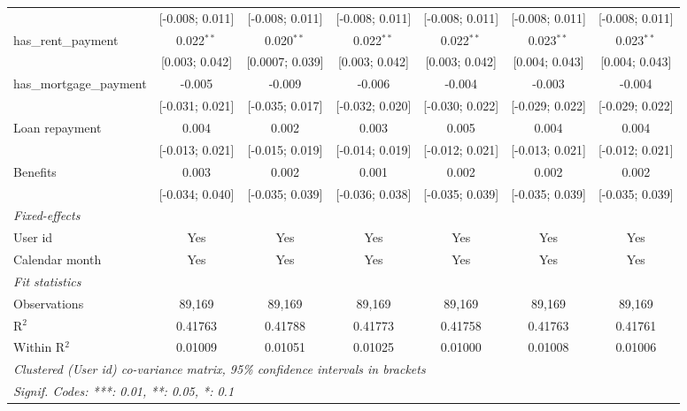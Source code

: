 \begin{table}[htbp]
\begin{threeparttable}[b]
\begin{tabular}{lcccccc}
                                   & [-0.008; 0.011]   & [-0.008; 0.011]  & [-0.008; 0.011]  & [-0.008; 0.011]  & [-0.008; 0.011]  & [-0.008; 0.011]\\   
         has\_rent\_payment        & 0.022$^{**}$      & 0.020$^{**}$     & 0.022$^{**}$     & 0.022$^{**}$     & 0.023$^{**}$     & 0.023$^{**}$\\   
                                   & [0.003; 0.042]    & [0.0007; 0.039]  & [0.003; 0.042]   & [0.003; 0.042]   & [0.004; 0.043]   & [0.004; 0.043]\\   
         has\_mortgage\_payment    & -0.005            & -0.009           & -0.006           & -0.004           & -0.003           & -0.004\\   
                                   & [-0.031; 0.021]   & [-0.035; 0.017]  & [-0.032; 0.020]  & [-0.030; 0.022]  & [-0.029; 0.022]  & [-0.029; 0.022]\\   
         Loan repayment            & 0.004             & 0.002            & 0.003            & 0.005            & 0.004            & 0.004\\   
                                   & [-0.013; 0.021]   & [-0.015; 0.019]  & [-0.014; 0.019]  & [-0.012; 0.021]  & [-0.013; 0.021]  & [-0.012; 0.021]\\   
         Benefits                  & 0.003             & 0.002            & 0.001            & 0.002            & 0.002            & 0.002\\   
                                   & [-0.034; 0.040]   & [-0.035; 0.039]  & [-0.036; 0.038]  & [-0.035; 0.039]  & [-0.035; 0.039]  & [-0.035; 0.039]\\   
         \midrule
         \emph{Fixed-effects}\\
         User id                   & Yes               & Yes              & Yes              & Yes              & Yes              & Yes\\  
         Calendar month            & Yes               & Yes              & Yes              & Yes              & Yes              & Yes\\  
         \midrule
         \emph{Fit statistics}\\
         Observations              & 89,169            & 89,169           & 89,169           & 89,169           & 89,169           & 89,169\\  
         R$^2$                     & 0.41763           & 0.41788          & 0.41773          & 0.41758          & 0.41763          & 0.41761\\  
         Within R$^2$              & 0.01009           & 0.01051          & 0.01025          & 0.01000          & 0.01008          & 0.01006\\  
         \midrule \midrule
         \multicolumn{7}{l}{\emph{Clustered (User id) co-variance matrix, 95\% confidence intervals in brackets}}\\
         \multicolumn{7}{l}{\emph{Signif. Codes: ***: 0.01, **: 0.05, *: 0.1}}\\
      \end{tabular}
      

\end{threeparttable}
\end{table}
